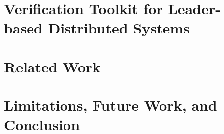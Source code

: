 \documentclass[letterpaper,11pt]{yalephd}
\begin{document}
\chapter{Verification Toolkit for Leader-based Distributed Systems }
\label{chapter:witness-passing}








%


\chapter{Related Work} 
\label{chapter:related}


\chapter{Limitations, Future Work, and Conclusion}
\label{chapter:conclusion}


\backmatter


\end{document}
